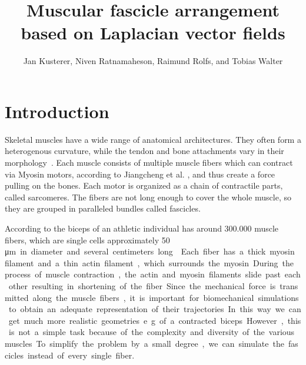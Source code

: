 \documentclass[preprint,journal]{vgtc}       %
\title{Muscular fascicle arrangement based on Laplacian vector fields}
\author{Jan Kusterer, Niven Ratnamaheson, Raimund Rolfs, and Tobias Walter}
\begin{document}
\maketitle

\section{Introduction}\label{sec:intro}
Skeletal muscles have a wide range of anatomical architectures. 
They often form a heterogenous curvature, while the tendon and bone attachments vary in their morphology~\cite{Choi2013}. 
Each muscle consists of multiple muscle fibers which can contract via Myosin motors, according to Jiangcheng et al. 
\cite{Jiangcheng2015}, and thus create a force pulling on the bones. 
Each motor is organized as a chain of contractile parts, called sarcomeres. 
The fibers are not long enough to cover the whole muscle, so they are grouped in paralleled bundles called fascicles. 

According to \cite{Etemadi.et.Al.} the biceps of an athletic individual has around 300.000 muscle fibers, which are single cells approximately 50 \si\micro m in diameter and several centimeters long \cite{Cooper2000}. 
Each fiber has a thick myosin filament and a thin actin filament, which surrounds the myosin. 
During the process of muscle contraction, the actin and myosin filaments slide past each other resulting in shortening of the fiber.

Since the mechanical force is transmitted along the muscle fibers, it is important for biomechanical simulations to obtain an adequate representation of their trajectories. 
In this way we can get much more realistic geometries e.g. of a contracted biceps.
However, this is not a simple task because of the complexity and diversity of the various muscles. 
To simplify the problem by a small degree, we can simulate the fascicles instead of every single fiber.
\end{document}
